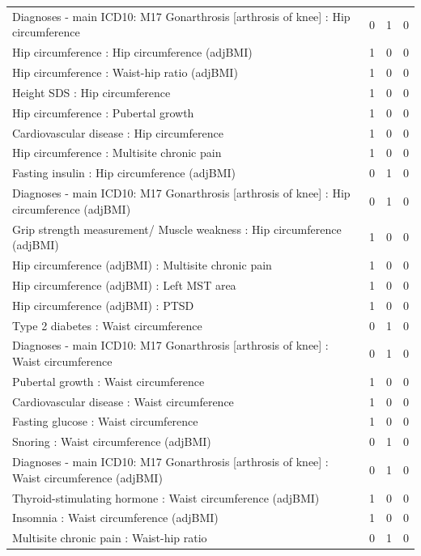 \begin{table}[ht]
\begin{tabular}{lrrr}
  Diagnoses - main ICD10: M17 Gonarthrosis [arthrosis of knee] : Hip circumference  &   0 &   1 &   0 \\ 
  Hip circumference  : Hip circumference (adjBMI) &   1 &   0 &   0 \\ 
  Hip circumference  : Waist-hip ratio (adjBMI) &   1 &   0 &   0 \\ 
  Height SDS : Hip circumference  &   1 &   0 &   0 \\ 
  Hip circumference  : Pubertal growth  &   1 &   0 &   0 \\ 
  Cardiovascular disease : Hip circumference  &   1 &   0 &   0 \\ 
  Hip circumference  : Multisite chronic pain &   1 &   0 &   0 \\ 
  Fasting insulin : Hip circumference (adjBMI) &   0 &   1 &   0 \\ 
  Diagnoses - main ICD10: M17 Gonarthrosis [arthrosis of knee] : Hip circumference (adjBMI) &   0 &   1 &   0 \\ 
  Grip strength measurement/ Muscle weakness : Hip circumference (adjBMI) &   1 &   0 &   0 \\ 
  Hip circumference (adjBMI) : Multisite chronic pain &   1 &   0 &   0 \\ 
  Hip circumference (adjBMI) : Left MST area &   1 &   0 &   0 \\ 
  Hip circumference (adjBMI) : PTSD &   1 &   0 &   0 \\ 
  Type 2 diabetes : Waist circumference  &   0 &   1 &   0 \\ 
  Diagnoses - main ICD10: M17 Gonarthrosis [arthrosis of knee] : Waist circumference  &   0 &   1 &   0 \\ 
  Pubertal growth  : Waist circumference  &   1 &   0 &   0 \\ 
  Cardiovascular disease : Waist circumference  &   1 &   0 &   0 \\ 
  Fasting glucose : Waist circumference  &   1 &   0 &   0 \\ 
  Snoring : Waist circumference (adjBMI) &   0 &   1 &   0 \\ 
  Diagnoses - main ICD10: M17 Gonarthrosis [arthrosis of knee] : Waist circumference (adjBMI) &   0 &   1 &   0 \\ 
  Thyroid-stimulating hormone  : Waist circumference (adjBMI) &   1 &   0 &   0 \\ 
  Insomnia : Waist circumference (adjBMI) &   1 &   0 &   0 \\ 
  Multisite chronic pain : Waist-hip ratio  &   0 &   1 &   0 \\ 

\end{tabular}
\end{table}
